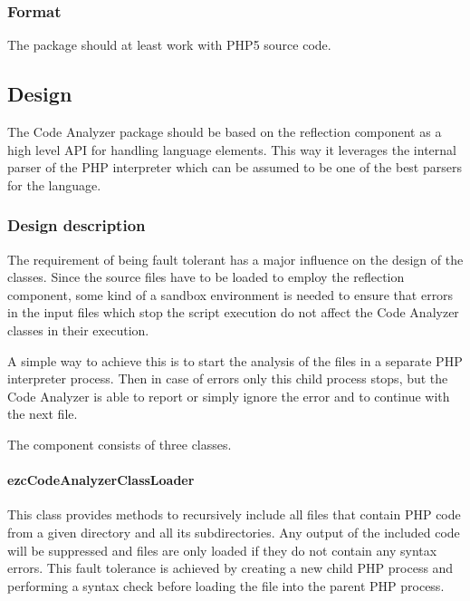 \documentclass[10pt,final,a4paper,oneside]{article}
\begin{document}
\subsubsection{Format}
The package should at least work with PHP5 source code.


\subsection{Design}\label{subsec:CodeAnalyzerDesign}
%
%

The Code Analyzer package should be based on the reflection component
as a high level API for handling language elements.
This way it leverages the internal parser of the PHP interpreter
which can be assumed to be one of the best parsers for the language.

\subsubsection{Design description}
The requirement of being fault tolerant has a major influence
on the design of the classes.
Since the source files have to be loaded
to employ the reflection component, some kind
of a sandbox environment is needed to ensure that errors
in the input files which stop the script execution
do not affect the Code Analyzer classes in their execution.

A simple way to achieve this is to start the analysis of the files
in a separate PHP interpreter process.
Then in case of errors only this child process stops,
but the Code Analyzer is able to report or simply ignore the error
and to continue with the next file.

The component consists of three classes.

\paragraph{ezcCodeAnalyzerClassLoader}
This class provides methods to recursively include
all files that contain PHP code from a given directory and all its subdirectories.
Any output of the included code will be suppressed
and files are only loaded if they do not contain
any syntax errors.
This fault tolerance is achieved by creating a new child PHP process
and performing a syntax check before loading the file into the parent PHP process.
\end{document}
